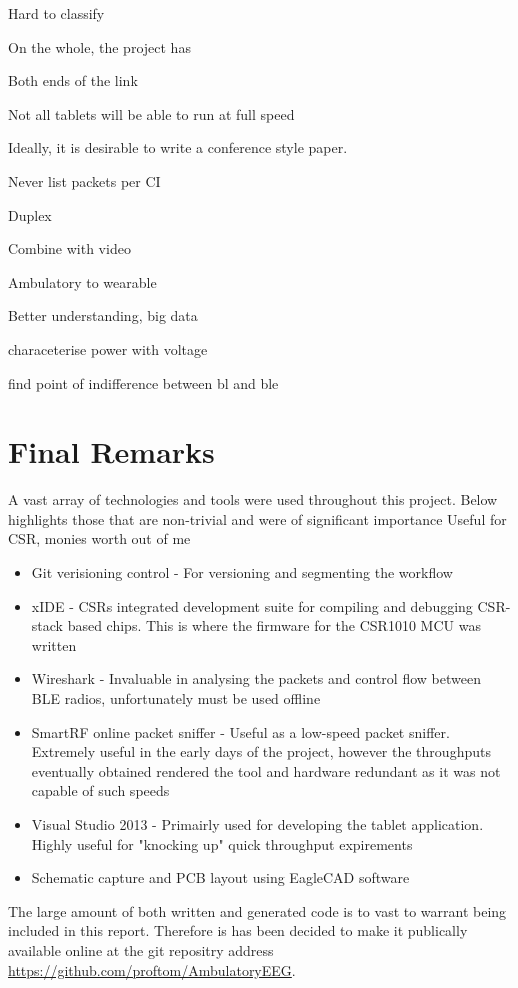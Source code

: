 \documentclass[]{article}
\begin{document}
Hard to classify

On the whole, the project has 

Both ends of the link 

Not all tablets will be able to run at full speed

Ideally, it is desirable to write a conference style paper. 

Never list packets per CI

Duplex

Combine with video

Ambulatory to wearable

Better understanding, big data

characeterise power with voltage

find point of indifference between bl and ble

\section{Final Remarks}
A vast array of technologies and tools were used throughout this project. Below highlights those that are non-trivial and were of significant importance
Useful for CSR, monies worth out of me

\begin{itemize}
	\item Git verisioning control - For versioning and segmenting the workflow
	\item xIDE - CSRs integrated development suite for compiling and debugging CSR-stack based chips. This is where the firmware for the CSR1010 MCU was written
	\item Wireshark - Invaluable in analysing the packets and control flow between BLE radios, unfortunately must be used offline
	\item SmartRF online packet sniffer - Useful as a low-speed packet sniffer. Extremely useful in the early days of the project, however the throughputs eventually obtained rendered the tool and hardware redundant as it was not capable of such speeds
	\item Visual Studio 2013 - Primairly used for developing the tablet application. Highly useful for "knocking up" quick throughput expirements 
	\item Schematic capture and \ac{PCB} layout using EagleCAD software
\end{itemize}

The large amount of both written and generated code is to vast to warrant being included in this report. Therefore is has been decided to make it publically available online at the git repositry address 
\url{https://github.com/proftom/AmbulatoryEEG}.
\clearpage
\end{document}
